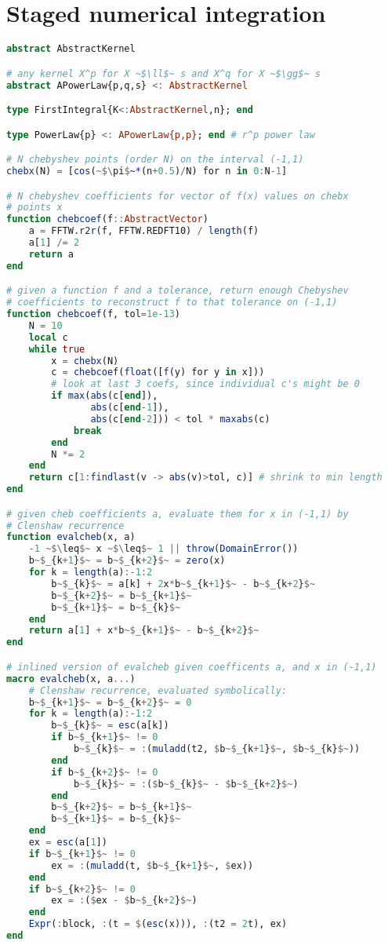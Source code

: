 \chapter{Staged numerical integration}
\label{appendix:integration}

\begin{singlespace}
\begin{lstlisting}[language=julia]
abstract AbstractKernel

# any kernel X^p for X ~$\ll$~ s and X^q for X ~$\gg$~ s
abstract APowerLaw{p,q,s} <: AbstractKernel

type FirstIntegral{K<:AbstractKernel,n}; end

type PowerLaw{p} <: APowerLaw{p,p}; end # r^p power law

# N chebyshev points (order N) on the interval (-1,1)
chebx(N) = [cos(~$\pi$~*(n+0.5)/N) for n in 0:N-1]

# N chebyshev coefficients for vector of f(x) values on chebx
# points x
function chebcoef(f::AbstractVector)
    a = FFTW.r2r(f, FFTW.REDFT10) / length(f)
    a[1] /= 2
    return a
end

# given a function f and a tolerance, return enough Chebyshev
# coefficients to reconstruct f to that tolerance on (-1,1)
function chebcoef(f, tol=1e-13)
    N = 10
    local c
    while true
        x = chebx(N)
        c = chebcoef(float([f(y) for y in x]))
        # look at last 3 coefs, since individual c's might be 0
        if max(abs(c[end]),
               abs(c[end-1]),
               abs(c[end-2])) < tol * maxabs(c)
            break
        end
        N *= 2
    end
    return c[1:findlast(v -> abs(v)>tol, c)] # shrink to min length
end

# given cheb coefficients a, evaluate them for x in (-1,1) by
# Clenshaw recurrence
function evalcheb(x, a)
    -1 ~$\leq$~ x ~$\leq$~ 1 || throw(DomainError())
    b~$_{k+1}$~ = b~$_{k+2}$~ = zero(x)
    for k = length(a):-1:2
        b~$_{k}$~ = a[k] + 2x*b~$_{k+1}$~ - b~$_{k+2}$~
        b~$_{k+2}$~ = b~$_{k+1}$~
        b~$_{k+1}$~ = b~$_{k}$~
    end
    return a[1] + x*b~$_{k+1}$~ - b~$_{k+2}$~
end

# inlined version of evalcheb given coefficents a, and x in (-1,1)
macro evalcheb(x, a...)
    # Clenshaw recurrence, evaluated symbolically:
    b~$_{k+1}$~ = b~$_{k+2}$~ = 0
    for k = length(a):-1:2
        b~$_{k}$~ = esc(a[k])
        if b~$_{k+1}$~ != 0
            b~$_{k}$~ = :(muladd(t2, $b~$_{k+1}$~, $b~$_{k}$~))
        end
        if b~$_{k+2}$~ != 0
            b~$_{k}$~ = :($b~$_{k}$~ - $b~$_{k+2}$~)
        end
        b~$_{k+2}$~ = b~$_{k+1}$~
        b~$_{k+1}$~ = b~$_{k}$~
    end
    ex = esc(a[1])
    if b~$_{k+1}$~ != 0
        ex = :(muladd(t, $b~$_{k+1}$~, $ex))
    end
    if b~$_{k+2}$~ != 0
        ex = :($ex - $b~$_{k+2}$~)
    end
    Expr(:block, :(t = $(esc(x))), :(t2 = 2t), ex)
end


\end{lstlisting}
\end{singlespace}
